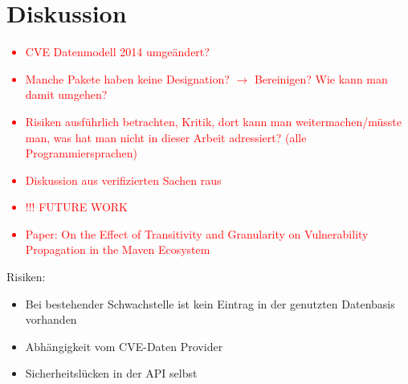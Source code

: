 \section{Diskussion} \label{sec:Diskussion}
    \textcolor{red}{
        \begin{itemize}
            \item \ac{CVE} Datenmodell 2014 umgeändert?
            \item Manche Pakete haben keine Designation? $\rightarrow$ Bereinigen? Wie kann man damit umgehen?
            \item Risiken ausführlich betrachten, Kritik, dort kann man weitermachen/müsste man, was hat man nicht in dieser Arbeit adressiert? (alle Programmiersprachen)
            \item Diskussion aus verifizierten Sachen raus
            \item !!! FUTURE WORK
            \item Paper: On the Effect of Transitivity and Granularity on Vulnerability Propagation in the Maven Ecosystem
        \end{itemize}
    }
    Risiken:
    \begin{itemize}
        \item Bei bestehender Schwachstelle ist kein Eintrag in der genutzten Datenbasis vorhanden
        \item Abhängigkeit vom \ac{CVE}-Daten Provider
        \item Sicherheitslücken in der \ac{API} selbst
    \end{itemize}